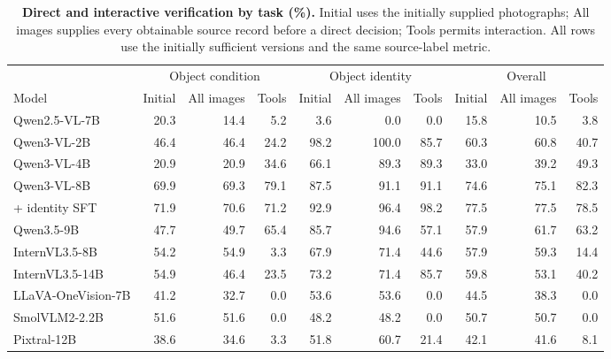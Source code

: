 \begin{table}[t]
\centering\small
\setlength{\tabcolsep}{4pt}
\begin{minipage}{.96\textwidth}\centering
\caption{\textbf{Direct and interactive verification by task (\%).}
Initial uses the initially supplied photographs; All images supplies every obtainable source record before a direct decision; Tools permits interaction.
All rows use the initially sufficient versions and the same source-label metric.}
\label{tab:full-reference}
\begin{tabular}{@{}lrrrrrrrrr@{}}
\toprule
 & \multicolumn{3}{c}{Object condition} & \multicolumn{3}{c}{Object identity} & \multicolumn{3}{c}{Overall}\\
\cmidrule(lr){2-4}\cmidrule(lr){5-7}\cmidrule(l){8-10}
Model & Initial & All images & Tools & Initial & All images & Tools & Initial & All images & Tools\\
\midrule
Qwen2.5-VL-7B & 20.3 & 14.4 & 5.2 & 3.6 & 0.0 & 0.0 & 15.8 & 10.5 & 3.8\\
Qwen3-VL-2B & 46.4 & 46.4 & 24.2 & 98.2 & 100.0 & 85.7 & 60.3 & 60.8 & 40.7\\
Qwen3-VL-4B & 20.9 & 20.9 & 34.6 & 66.1 & 89.3 & 89.3 & 33.0 & 39.2 & 49.3\\
Qwen3-VL-8B & 69.9 & 69.3 & 79.1 & 87.5 & 91.1 & 91.1 & 74.6 & 75.1 & 82.3\\
\quad + identity SFT & 71.9 & 70.6 & 71.2 & 92.9 & 96.4 & 98.2 & 77.5 & 77.5 & 78.5\\
Qwen3.5-9B & 47.7 & 49.7 & 65.4 & 85.7 & 94.6 & 57.1 & 57.9 & 61.7 & 63.2\\
InternVL3.5-8B & 54.2 & 54.9 & 3.3 & 67.9 & 71.4 & 44.6 & 57.9 & 59.3 & 14.4\\
InternVL3.5-14B & 54.9 & 46.4 & 23.5 & 73.2 & 71.4 & 85.7 & 59.8 & 53.1 & 40.2\\
LLaVA-OneVision-7B & 41.2 & 32.7 & 0.0 & 53.6 & 53.6 & 0.0 & 44.5 & 38.3 & 0.0\\
SmolVLM2-2.2B & 51.6 & 51.6 & 0.0 & 48.2 & 48.2 & 0.0 & 50.7 & 50.7 & 0.0\\
Pixtral-12B & 38.6 & 34.6 & 3.3 & 51.8 & 60.7 & 21.4 & 42.1 & 41.6 & 8.1\\
\bottomrule
\end{tabular}
\end{minipage}
\end{table}
